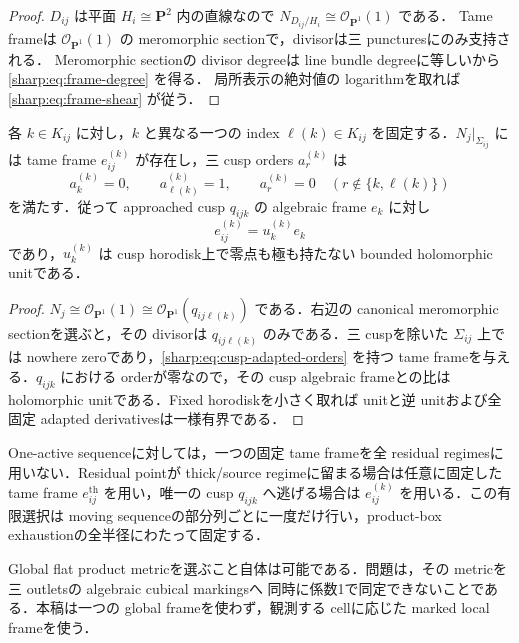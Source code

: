 \documentclass[a4paper,11pt]{ltjsarticle}
\numberwithin{equation}{section}
\theoremstyle{plain}
\theoremstyle{definition}
\theoremstyle{remark}
\newcommand{\PP}{\mathbf P}\newcommand{\CC}{\mathbf C}\newcommand{\RR}{\mathbf R}\newcommand{\ZZ}{\mathbf Z}\newcommand{\NN}{\mathbf N}
\begin{document}
\begin{proof}
$D_{ij}$ は平面 $H_i\cong\PP^2$ 内の直線なので $N_{D_{ij}/H_i}\cong\mathcal O_{\PP^1}(1)$ である．
Tame frameは $\mathcal O_{\PP^1}(1)$ の meromorphic sectionで，divisorは三 puncturesにのみ支持される．
Meromorphic sectionの divisor degreeは line bundle degreeに等しいから \eqref{sharp:eq:frame-degree} を得る．
局所表示の絶対値の logarithmを取れば \eqref{sharp:eq:frame-shear} が従う．
\end{proof}


\begin{proposition}\label{sharp:prop:cusp-adapted-frame-family}
各 $k\in K_{ij}$ に対し，$k$ と異なる一つの index $\ell(k)\in K_{ij}$ を固定する．$N_j|_{\Sigma_{ij}}$ には tame frame $e^{(k)}_{ij}$ が存在し，三 cusp orders $a_r^{(k)}$ は
\begin{equation}\label{sharp:eq:cusp-adapted-orders}
 a_k^{(k)}=0,\qquad a_{\ell(k)}^{(k)}=1,\qquad
 a_r^{(k)}=0\quad(r\notin\{k,\ell(k)\})
\end{equation}
を満たす．従って approached cusp $q_{ijk}$ の algebraic frame $e_k$ に対し
\[
 e^{(k)}_{ij}=u_k^{(k)}e_k
\]
であり，$u_k^{(k)}$ は cusp horodisk上で零点も極も持たない bounded holomorphic unitである．
\end{proposition}

\begin{proof}
$N_j\cong\mathcal O_{\PP^1}(1)\cong\mathcal O_{\PP^1}(q_{ij\ell(k)})$ である．右辺の canonical meromorphic sectionを選ぶと，その divisorは $q_{ij\ell(k)}$ のみである．三 cuspを除いた $\Sigma_{ij}$ 上では nowhere zeroであり，\eqref{sharp:eq:cusp-adapted-orders} を持つ tame frameを与える．$q_{ijk}$ における orderが零なので，その cusp algebraic frameとの比は holomorphic unitである．Fixed horodiskを小さく取れば unitと逆 unitおよび全固定 adapted derivativesは一様有界である．
\end{proof}

\begin{remark}
One-active sequenceに対しては，一つの固定 tame frameを全 residual regimesに用いない．Residual pointが thick/source regimeに留まる場合は任意に固定した tame frame $e^{\mathrm{th}}_{ij}$ を用い，唯一の cusp $q_{ijk}$ へ逃げる場合は $e^{(k)}_{ij}$ を用いる．この有限選択は moving sequenceの部分列ごとに一度だけ行い，product-box exhaustionの全半径にわたって固定する．
\end{remark}

\begin{remark}
Global flat product metricを選ぶこと自体は可能である．問題は，その metricを三 outletsの algebraic cubical markingsへ
同時に係数1で同定できないことである．本稿は一つの global frameを使わず，観測する cellに応じた marked local frameを使う．
\end{remark}
\end{document}
